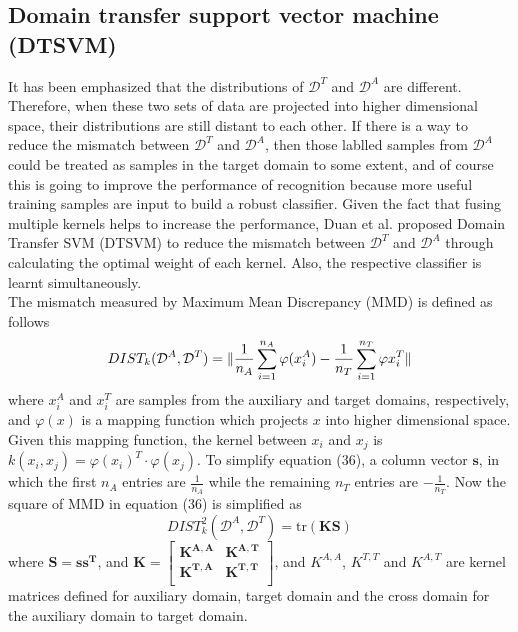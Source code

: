 \subsection{Domain transfer support vector machine (DTSVM)}
It has been emphasized that the distributions of $\mathcal{D}^T$ and $\mathcal{D}^A$ are different. Therefore, when these two sets of data are projected into higher dimensional space, their distributions are still distant to each other. If there is a way to reduce the mismatch between $\mathcal{D}^T$ and $\mathcal{D}^A$, then those lablled samples from $\mathcal{D}^A$ could be treated as samples in the target domain to some extent, and of course this is going to improve the performance of recognition because more useful training samples are input to build a robust classifier. Given the fact that fusing multiple kernels helps to increase the performance, Duan et al. \cite{duan2009domain} proposed Domain Transfer SVM (DTSVM) to reduce the mismatch between $\mathcal{D}^T$ and $\mathcal{D}^A$ through calculating the optimal weight of each kernel. Also, the respective classifier is learnt simultaneously. \\

\noindent The mismatch measured by Maximum Mean Discrepancy (MMD) \cite{borgwardt2006integrating} is defined as follows
\begin{equation}
DIST_k(\mathcal{D}^A, \mathcal{D}^T) = \lVert \frac{1}{n_A} \sum_{i=1}^{n_A} \varphi(x_i^A) - \frac{1}{n_T} \sum_{i=1}^{n_T} \varphi{x_i^T} \rVert
\end{equation}
where $x_i^A$ and $x_i^T$ are samples from the auxiliary and target domains, respectively, and $\varphi(x)$ is a mapping function which projects $x$ into higher dimensional space. Given this mapping function, the kernel between $x_i$
 and $x_j$ is $k(x_i, x_j) = \varphi (x_i)^T \cdot \varphi (x_j)$. To simplify equation (36), a column vector $\mathbf{s}$, in which the first $n_A$ entries are $\frac{1}{n_A}$ while the remaining $n_T$ entries are $-\frac{1}{n_T}$. Now the square of MMD in equation (36) is simplified as 
\begin{equation}
DIST_k^2(\mathcal{D}^A, \mathcal{D}^T) = \text{tr}(\mathbf{KS})
\end{equation}
where $\mathbf{S = s s^T }$, and $\mathbf{K = \begin{bmatrix} K^{A,A} & K^{A,T} \\ K^{T, A} & K^{T,T}\\  \end{bmatrix}}$, and $K^{A,A}$, $K^{T,T}$ and $K^{A, T}$ are kernel matrices defined for auxiliary domain, target domain and the cross domain for the auxiliary domain to target domain.\\ 

